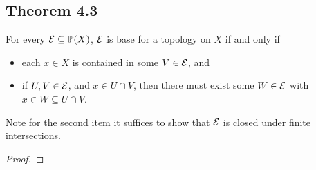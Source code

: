 \documentclass[../../main.tex]{subfiles}
\begin{document}
\subsection{Theorem 4.3}
\begin{wts}
    For every $\mathcal{E}\subseteq\mathbb{P}(X)$, $\mathcal{E}$ is base for a topology on $X$ if and only if
    \begin{itemize}
        \item each $x\in X$ is contained in some $V\in\mathcal{E}$, and
        \item if $U, V\in\mathcal{E}$, and $x\in U\cap V$, then there must exist some $W\in \mathcal{E}$ with $x\in W\subseteq U\cap V$.
    \end{itemize}
    Note for the second item it suffices to show that $\mathcal{E}$ is closed under finite intersections.
\end{wts}
\begin{proof}

\end{proof}
\end{document}
